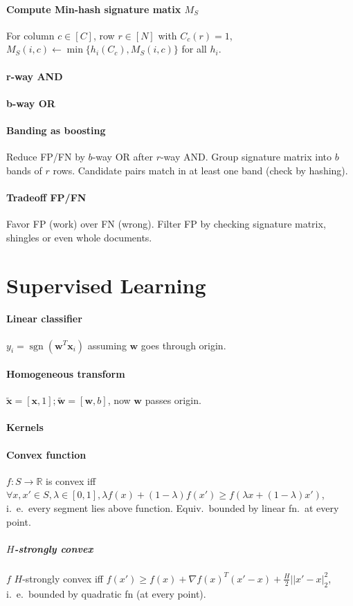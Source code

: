 \documentclass[9pt]{scrartcl}
\DeclareMathOperator{\sign}{sgn}
\newcommand{\R}{\mathbb{R}}
\begin{document}
\begin{twocolumn}
\paragraph{Compute Min-hash signature matix $M_S$}
For column $c \in [C]$, row $r \in [N]$ with $C_c(r) = 1$, $M_S(i,c) \leftarrow \min\{h_i(C_c), M_S(i,c)\}$ for all $h_i$.

\paragraph{r-way AND}
\paragraph{b-way OR}

\paragraph{Banding as boosting}
Reduce FP/FN by $b$-way OR after $r$-way AND.
Group signature matrix into $b$ bands of $r$ rows.
Candidate pairs match in at least one band (check by hashing).

\paragraph{Tradeoff FP/FN}
Favor FP (work) over FN (wrong).
Filter FP by checking signature matrix, shingles or even whole documents.


\section{Supervised Learning}
\paragraph{Linear classifier} $y_i = \sign(\bm w^T\bm x_i)$ assuming $\bm w$ goes through origin.
\paragraph{Homogeneous transform} $\tilde{\bm x} = [\bm x, 1]; \tilde{\bm w} = [\bm w, b]$, now $\bm w$ passes origin.
\paragraph{Kernels}
\paragraph{Convex function} $f: S \rightarrow \R$ is convex iff $\forall x,x'\in S, \lambda \in [0,1], \lambda f(x) + (1-\lambda)f(x') \geq f(\lambda x + (1-\lambda)x')$, i.\ e.\ every segment lies above function. Equiv.\ bounded by linear fn.\ at every point.
\subparagraph{$H$-strongly convex} $f$ $H$-strongly convex iff $f(x') \geq f(x) + \nabla f(x)^T(x'-x)+\frac{H}{2}||x'-x|_2^2$, i.\ e.\ bounded by quadratic fn (at every point).

\end{twocolumn}
\end{document}
